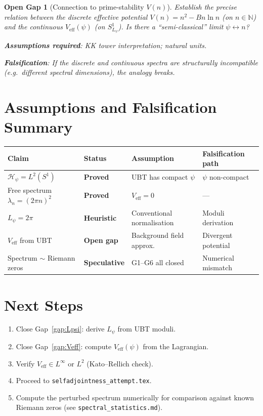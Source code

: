 \documentclass[11pt,a4paper]{article}
\newtheorem{gap}{Open Gap}
\begin{document}
\begin{gap}[Connection to prime-stability $V(n)$]
  \label{gap:discrete_continuous}
  Establish the precise relation between the discrete effective potential
  $V(n) = n^2 - Bn\ln n$ (on $n \in \mathbb{N}$) and the continuous
  $V_\mathrm{eff}(\psi)$ (on $S^1_{L_\psi}$).  Is there a ``semi-classical''
  limit $\psi \leftrightarrow n$?

  \textbf{Assumptions required}: KK tower interpretation; natural units.

  \textbf{Falsification}: If the discrete and continuous spectra are structurally
  incompatible (e.g.\ different spectral dimensions), the analogy breaks.
\end{gap}

\section{Assumptions and Falsification Summary}

\begin{center}
\begin{tabular}{llll}
\hline
Claim & Status & Assumption & Falsification path \\
\hline
$\mathscr{H}_\psi = L^2(S^1)$ & \textbf{Proved} & UBT has compact $\psi$ & $\psi$ non-compact \\
Free spectrum $\lambda_n = (2\pi n)^2$ & \textbf{Proved} & $V_\mathrm{eff}=0$ & --- \\
$L_\psi = 2\pi$ & \textbf{Heuristic} & Conventional normalisation & Moduli derivation \\
$V_\mathrm{eff}$ from UBT & \textbf{Open gap} & Background field approx. & Divergent potential \\
Spectrum $\sim$ Riemann zeros & \textbf{Speculative} & G1--G6 all closed & Numerical mismatch \\
\hline
\end{tabular}
\end{center}

\section{Next Steps}

\begin{enumerate}
\item Close Gap~\ref{gap:Lpsi}: derive $L_\psi$ from UBT moduli.
\item Close Gap~\ref{gap:Veff}: compute $V_\mathrm{eff}(\psi)$ from the
      Lagrangian.
\item Verify $V_\mathrm{eff} \in L^\infty$ or $L^2$ (Kato--Rellich check).
\item Proceed to \texttt{selfadjointness\_attempt.tex}.
\item Compute the perturbed spectrum numerically for comparison against
      known Riemann zeros (see \texttt{spectral\_statistics.md}).
\end{enumerate}
\end{document}
